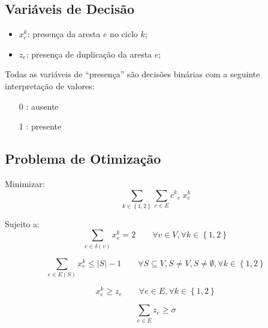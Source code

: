 \documentclass{article}
\newcommand{\Set}[1]{\ensuremath{\left\{#1\right\}}}
\newcommand{\Sum}[1]{\ensuremath{\displaystyle\sum\limits_{#1}}}
\newcommand{\abs}[1]{\ensuremath{\left| #1 \right|}}
\newcommand{\edge}{\ensuremath{e}}
\newcommand{\edges}{\ensuremath{E}}
\newcommand{\vertex}{\ensuremath{v}}
\newcommand{\vertices}{\ensuremath{V}}
\newcommand{\ncycles}{2}
\newcommand{\allCycles}{\ensuremath{\Set{1, \ncycles}}}
\newcommand{\cycle}{\ensuremath{k}}
\newcommand{\subvertices}{\ensuremath{S}}
\newcommand{\cost}[1]{\ensuremath{c^{#1}}}
\newcommand{\costke}{\ensuremath{\cost{\cycle}_{\edge}}}
\newcommand{\X}{\ensuremath{x}}
\newcommand{\xke}{\ensuremath{\X^{\cycle}_{\edge}}}
\newcommand{\Z}{\ensuremath{z}}
\newcommand{\ze}{\ensuremath{\Z_{\edge}}}
\newcommand{\similarity}{\ensuremath{\sigma}}
\begin{document}
\subsection{Variáveis de Decisão}
\label{constraint:variables}

\begin{itemize}
	\item $\xke$: presença da aresta $\edge$ no ciclo $\cycle$;
	\item $\ze$: presença de duplicação da aresta $\edge$;
\end{itemize}

Todas as variáveis de ``presença'' são decisões binárias com a seguinte interpretação de valores:

\begin{itemize}
	\item[0]: ausente
	\item[1]: presente
\end{itemize}

\subsection{Problema de Otimização}
\label{subsec:problem}

Minimizar:
\begin{equation}
    \label{eq:goal}
 	\Sum{\cycle \in \allCycles}
 	\Sum{\edge \in \edges}
 	\costke \ \xke
\end{equation}

Sujeito a:
\begin{equation}
	\label{constraint:vertex presence}
	\Sum{\edge \in \delta(\vertex)} \xke = 2
	\qquad
	\forall \vertex \in \vertices,
	\forall \cycle \in \allCycles
\end{equation}

\begin{equation}
	\label{constraint:no subcycle}
	\Sum{\edge \in \edges(\subvertices)} \xke \leqslant \abs{\subvertices} - 1
	\qquad
	\forall
		\subvertices \subseteq \vertices,
		\subvertices \neq \vertices,
		\subvertices \neq \emptyset,
		\forall \cycle \in \allCycles
\end{equation}

\begin{equation}
	\label{constraint:similarity compatibility}
	\xke \geqslant \ze
	\qquad
	\forall \edge \in \edges,
	\forall \cycle \in \allCycles
\end{equation}

\begin{equation}
	\label{constraint:similarity}
	\Sum{\edge \in \edges} \ze \geqslant \similarity
\end{equation}
\end{document}
